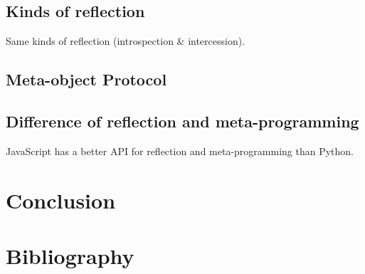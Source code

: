 \documentclass[a4paper,10pt]{article}
\begin{document}
\subsection{Kinds of reflection}

Same kinds of reflection (introspection \& intercession).


\subsection{Meta-object Protocol}





\subsection{Difference of reflection and meta-programming}

JavaScript has a better API for reflection and meta-programming than Python.



\section{Conclusion}



\section{Bibliography}
\end{document}
